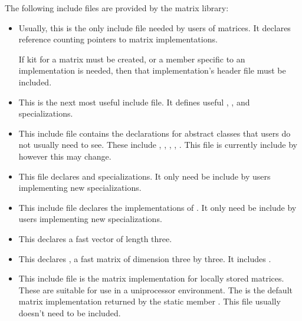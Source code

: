 The following include files are provided by the matrix library:

\begin{itemize}
\item[\filnm{matrix.h}]
Usually, this is the only include file needed by users of matrices.  It
declares reference counting pointers to matrix implementations.

If kit for a matrix must be created, or a member specific to an
implementation is needed, then that implementation's header file must be
included.

\item[\filnm{elemop.h}]
This is the next most useful include file.  It defines useful
, , and 
specializations.

\item[\filnm{abstract.h}]
This include file contains the declarations for abstract classes that
users do not usually need to see.  These include ,
, , ,
.  This file is currently include by 
however this may change.

\item[\filnm{block.h}]
This file declares  and specializations.  It
only need be include by users implementing new 
specializations.

\item[\filnm{blkiter.h}]
This include file declares the implementations of
.  It only need be include by users implementing
new  specializations.

\item[\filnm{vector3.h}]
This declares  a fast vector of length three.

\item[\filnm{matrix3.h}]
This declares , a fast matrix of dimension three by
three.  It includes .

\item[\filnm{local.h}]
This include file is the matrix implementation for locally stored
matrices.  These are suitable for use in a uniprocessor environment.
The  is the default matrix implementation
returned by the static member .
This file usually doesn't need to be included.


\end{itemize}
